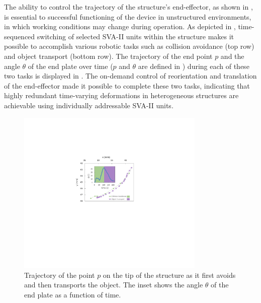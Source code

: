 The ability to control the trajectory of the structure's end-effector, as shown in , is essential to successful functioning of the device in unstructured environments, in which working conditions may change during operation. As depicted in , time-sequenced switching of selected SVA-II units within the structure makes it possible to accomplish various robotic tasks such as collision avoidance (top row) and object transport (bottom row). The trajectory of the end point $p$ and the angle $\theta$ of the end plate over time ($p$ and $\theta$ are defined in ) during each of these two tasks is displayed  in . The on-demand control of reorientation and translation of the end-effector made it possible to complete these two tasks, indicating that highly redundant time-varying deformations in heterogeneous structures are achievable using individually addressable SVA-II units.
\begin{figure}[!ht]
\centering
\includegraphics[width=0.8\textwidth]{unstructuredTraj.pdf}
\caption[]{Trajectory of the point $p$ on the tip of the structure as it first avoids and then transports the object. The inset shows the angle $\theta$ of the end plate as a function of time.}
\label{fig:unstructuredTraj}
\end{figure}


